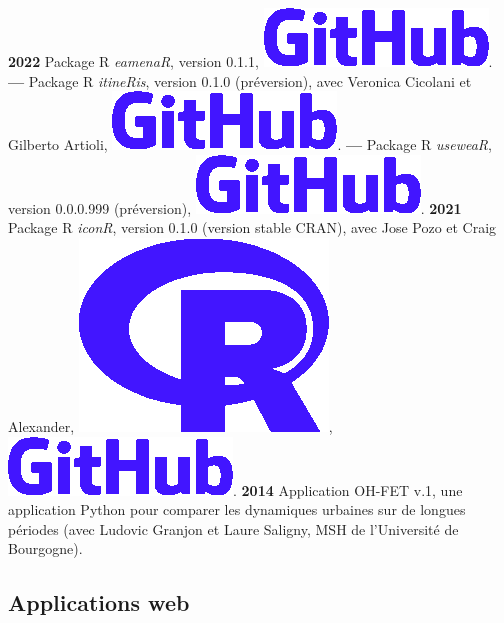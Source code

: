 \documentclass{article}
\begin{document}
\textbf{2022 }Package \textsf{R} \textit{eamenaR}, version 0.1.1, \href{https://github.com/eamena-project/eamenaR/tree/main#readme}{\includegraphics[scale=0.1]{github-rect.png}}.
\smallbreak
\textbf{--- }Package \textsf{R} \textit{itineRis}, version 0.1.0 (préversion), avec Veronica Cicolani et Gilberto Artioli, \href{https://github.com/zoometh/itineRis/tree/main#readme}{\includegraphics[scale=0.1]{github-rect.png}}.
\textbf{--- }Package \textsf{R} \textit{useweaR}, version 0.0.0.999 (préversion), \href{https://github.com/zoometh/itineRis/tree/main#readme}{\includegraphics[scale=0.1]{github-rect.png}}.
\smallbreak
\textbf{2021 }Package \textsf{R} \textit{iconR}, version 0.1.0 (version stable CRAN), avec Jose Pozo et Craig Alexander, \href{https://cran.r-project.org/web/packages/iconr/index.html}{\includegraphics[scale=0.04]{prog-r.png}}, \href{https://github.com/zoometh/iconr#readme}{\includegraphics[scale=0.1]{github-rect.png}}.
\smallbreak
\textbf{2014 }Application \textsf{OH-FET} v.1, une application \textsf{Python} pour comparer les dynamiques urbaines sur de longues périodes (avec Ludovic Granjon et Laure Saligny, MSH de l'Université de Bourgogne).

\subsection*{Applications web}
\end{document}
